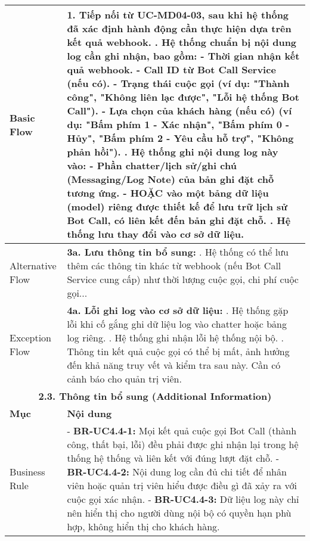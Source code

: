 \begin{longtable}{|m{4cm}|p{11cm}|}
Basic Flow & 1. Tiếp nối từ UC-MD04-03, sau khi hệ thống đã xác định hành động cần thực hiện dựa trên kết quả webhook. \newline 2. Hệ thống chuẩn bị nội dung log cần ghi nhận, bao gồm: \newline    - Thời gian nhận kết quả webhook. \newline    - Call ID từ Bot Call Service (nếu có). \newline    - Trạng thái cuộc gọi (ví dụ: "Thành công", "Không liên lạc được", "Lỗi hệ thống Bot Call"). \newline    - Lựa chọn của khách hàng (nếu có) (ví dụ: "Bấm phím 1 - Xác nhận", "Bấm phím 0 - Hủy", "Bấm phím 2 - Yêu cầu hỗ trợ", "Không phản hồi"). \newline 3. Hệ thống ghi nội dung log này vào: \newline    - Phần chatter/lịch sử/ghi chú (Messaging/Log Note) của bản ghi đặt chỗ tương ứng. \newline    - HOẶC vào một bảng dữ liệu (model) riêng được thiết kế để lưu trữ lịch sử Bot Call, có liên kết đến bản ghi đặt chỗ. \newline 4. Hệ thống lưu thay đổi vào cơ sở dữ liệu. \\
\hline
Alternative Flow & \textbf{3a. Lưu thông tin bổ sung:} \newline    1. Hệ thống có thể lưu thêm các thông tin khác từ webhook (nếu Bot Call Service cung cấp) như thời lượng cuộc gọi, chi phí cuộc gọi... \\
\hline
Exception Flow & \textbf{4a. Lỗi ghi log vào cơ sở dữ liệu:} \newline    1. Hệ thống gặp lỗi khi cố gắng ghi dữ liệu log vào chatter hoặc bảng log riêng. \newline    2. Hệ thống ghi nhận lỗi hệ thống nội bộ. \newline    3. Thông tin kết quả cuộc gọi có thể bị mất, ảnh hưởng đến khả năng truy vết và kiểm tra sau này. Cần có cảnh báo cho quản trị viên. \\
\hline
\multicolumn{2}{|c|}{\textbf{2.3. Thông tin bổ sung (Additional Information)}} \\
\hline
\textbf{Mục} & \textbf{Nội dung} \\
\hline
Business Rule & - \textbf{BR-UC4.4-1:} Mọi kết quả cuộc gọi Bot Call (thành công, thất bại, lỗi) đều phải được ghi nhận lại trong hệ thống hệ thống và liên kết với đúng lượt đặt chỗ. \newline - \textbf{BR-UC4.4-2:} Nội dung log cần đủ chi tiết để nhân viên hoặc quản trị viên hiểu được điều gì đã xảy ra với cuộc gọi xác nhận. \newline - \textbf{BR-UC4.4-3:} Dữ liệu log này chỉ nên hiển thị cho người dùng nội bộ có quyền hạn phù hợp, không hiển thị cho khách hàng. \\

\end{longtable}
